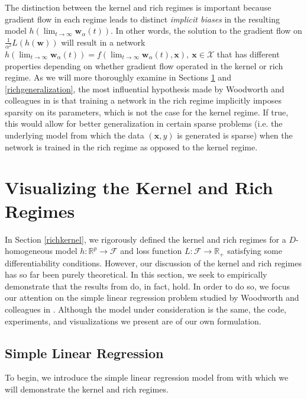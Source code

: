 \documentclass{article}
\begin{document}
The distinction between the kernel and rich regimes is important because gradient flow in each regime leads to distinct \textit{implicit biases} in the resulting model $h(\lim_{t \to\infty} \boldsymbol{w}_{\alpha}(t))$. In other words, the solution to the gradient flow on $\frac{1}{\alpha^2}L(h(\boldsymbol{w}))$ will result in a network $h(\lim_{t \to\infty} \boldsymbol{w}_{\alpha}(t)) = f(\lim_{t \to\infty} \boldsymbol{w}_{\alpha}(t), \boldsymbol{x}), \ \boldsymbol{x} \in \mathcal{X}$ that has different properties depending on whether gradient flow operated in the kernel or rich regime. As we will more thoroughly examine in Sections \ref{summarizekernel} and \ref{richgeneralization}, the most influential hypothesis made by Woodworth and colleagues in \cite{woodworth2020kernel} is that training a network in the rich regime implicitly imposes sparsity on its parameters, which is not the case for the kernel regime. If true, this would allow for better generalization in certain sparse problems (i.e. the underlying model from which the data $(\boldsymbol{x}, y)$ is generated is sparse) when the network is trained in the rich regime as opposed to the kernel regime.

\section{Visualizing the Kernel and Rich Regimes}\label{summarizekernel}

In Section \ref{richkernel}, we rigorously defined the kernel and rich regimes for a $D$-homogeneous model $h: \mathbb{R}^p \rightarrow \mathcal{F}$ and loss function $L: \mathcal{F} \rightarrow \mathbb{R}_+$ satisfying some differentiability conditions. However, our discussion of the kernel and rich regimes has so far been purely theoretical. In this section, we seek to empirically demonstrate that the results from \cite{chizat2018lazy} do, in fact, hold. In order to do so, we focus our attention on the simple linear regression problem studied by Woodworth and colleagues in \cite{woodworth2020kernel}. Although the model under consideration is the same, the code, experiments, and visualizations we present are of our own formulation.

\subsection{Simple Linear Regression}\label{linregmodel}

To begin, we introduce the simple linear regression model from \cite{woodworth2020kernel} with which we will demonstrate the kernel and rich regimes.
\end{document}
